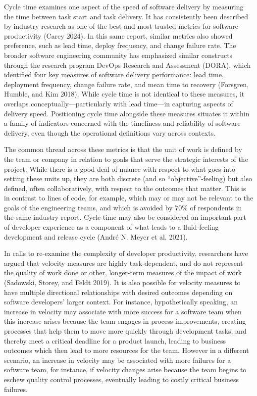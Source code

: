 \documentclass[
]{article}
\begin{document}
Cycle time examines one aspect of the speed of software delivery by
measuring the time between task start and task delivery. It has
consistently been described by industry research as one of the best and
most trusted metrics for software productivity (Carey 2024). In this
same report, similar metrics also showed preference, such as lead time,
deploy frequency, and change failure rate. The broader software
engineering community has emphasized similar constructs through the
research program DevOps Research and Assessment (DORA), which identified
four key measures of software delivery performance: lead time,
deployment frequency, change failure rate, and mean time to recovery
(Forsgren, Humble, and Kim 2018). While cycle time is not identical to
these measures, it overlaps conceptually---particularly with lead
time---in capturing aspects of delivery speed. Positioning cycle time
alongside these measures situates it within a family of indicators
concerned with the timeliness and reliability of software delivery, even
though the operational definitions vary across contexts.

The common thread across these metrics is that the unit of work is
defined by the team or company in relation to goals that serve the
strategic interests of the project. While there is a good deal of nuance
with respect to what goes into setting these units up, they are both
discrete (and so ``objective''-feeling) but also defined, often
collaboratively, with respect to the outcomes that matter. This is in
contrast to lines of code, for example, which may or may not be relevant
to the goals of the engineering teams, and which is avoided by 70\% of
respondents in the same industry report. Cycle time may also be
considered an important part of developer experience as a component of
what leads to a fluid-feeling development and release cycle (André N.
Meyer et al. 2021).

In calls to re-examine the complexity of developer productivity,
researchers have argued that velocity measures are highly
task-dependent, and do not represent the quality of work done or other,
longer-term measures of the impact of work (Sadowski, Storey, and Feldt
2019). It is also possible for velocity measures to have multiple
directional relationships with desired outcomes depending on software
developers' larger context. For instance, hypothetically speaking, an
increase in velocity may associate with more success for a software team
when this increase arises because the team engages in process
improvements, creating processes that help them to move more quickly
through development tasks, and thereby meet a critical deadline for a
product launch, leading to business outcomes which then lead to more
resources for the team. However in a different scenario, an increase in
velocity may be associated with more failures for a software team, for
instance, if velocity changes arise because the team begins to eschew
quality control processes, eventually leading to costly critical
business failures.
\end{document}
